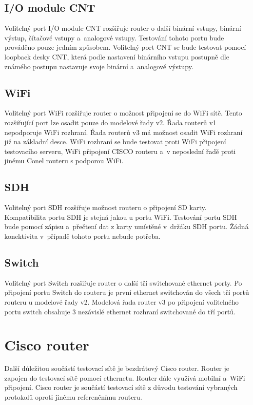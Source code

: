 \subsection{I/O module CNT}
Volitelný port I/O module CNT rozšiřuje router o další binární vstupy, binární výstup, čítačové vstupy a~analogové vstupy. Testování tohoto portu bude prováděno pouze jedním způsobem. Volitelný port CNT se bude testovat pomocí loopback desky CNT, která podle nastavení binárního vstupu postupně dle známého postupu nastavuje svoje binární a~analogové výstupy.

\subsection{WiFi}
Volitelný port WiFi rozšiřuje router o možnost připojení se do WiFi sítě. Tento rozšiřující port lze osadit pouze do modelové řady v2. Řada routerů v1 nepodporuje WiFi rozhraní. Řada routerů v3 má možnost osadit WiFi rozhraní již na základní desce. WiFi rozhraní se bude testovat proti WiFi připojení testovacího serveru, WiFi připojení CISCO routeru a~v neposlední řadě proti jinému Conel routeru s podporou WiFi.

\subsection{SDH}
Volitelný port SDH rozšiřuje možnost routeru o připojení SD karty. Kompatibilita portu SDH je stejná jakou u portu WiFi. Testování portu SDH bude pomocí zápisu a~přečtení dat z karty umístěné v~držáku SDH portu. Žádná konektivita v~případě tohoto portu nebude potřeba.

\subsection{Switch}
Volitelný port Switch rozšiřuje router o další tři switchované ethernet porty. Po připojení portu Switch do routeru je první ethernet switchován do všech tří portů routeru u modelové řady v2. Modelová řada router v3 po připojení volitelného portu switch obsahuje 3 nezávislé ethernet rozhraní switchované do tří portů.

\section{Cisco router}
Další důležitou součástí testovací sítě je bezdrátový Cisco router. Router je zapojen do testovací sítě pomocí ethernetu. Router dále využívá mobilní a~WiFi připojení. Cisco router je součástí testovací sítě z důvodu testování vybraných protokolů oproti jinému referenčnímu routeru.

